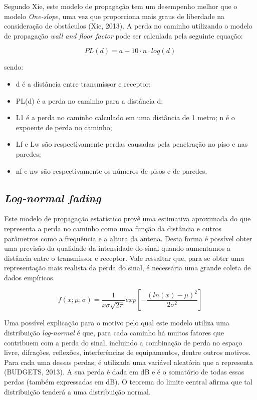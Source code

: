 \documentclass[
	12pt,				%
	openright,			%
	twoside,			%
	a4paper,			%
	english,			%
	french,				%
	spanish,			%
	brazil				%
	]{abntex2}
\begin{document}
Segundo Xie, este modelo de propagação tem um desempenho melhor que o modelo \textit{One-slope}, uma vez que proporciona mais graus de liberdade na consideração de obstáculos (Xie, 2013). A perda no caminho utilizando o modelo de propagação \textit{wall and floor factor} pode ser calculada pela seguinte equação:


\begin{equation}
PL(d) = a + 10 \cdot n \cdot log(d)
\end{equation}

sendo:

\begin{itemize}
	\item d é a distância entre transmissor e receptor;
	\item PL(d) é a perda no caminho para a distância d;
	\item L1 é a perda no caminho calculado em uma distância de 1 metro;
	n é o expoente de perda no caminho;
	\item Lf e Lw são respectivamente perdas causadas pela penetração no piso e nas paredes;
	\item nf e nw são respectivamente os números de pisos e de paredes.
\end{itemize}


\subsection[Log-normal fading]{\textit{Log-normal fading}}

Este modelo de propagação estatístico provê uma estimativa aproximada do que representa a perda no caminho como uma função da distância e outros parâmetros como a frequência e a altura da antena. Desta forma é possível obter uma previsão da qualidade da intensidade do sinal quando aumentamos a distância entre o transmissor e receptor. Vale ressaltar que, para se obter uma representação mais realista da perda do sinal, é necessária uma grande coleta de dados empíricos.


\begin{equation}
f(x; \mu; \sigma) = \frac{1}{x \sigma \sqrt{2 \pi}} exp[-\frac{(ln(x) - \mu)^{2}}{2 \sigma^{2}}]
\end{equation}

Uma possível explicação para o motivo pelo qual este modelo utiliza uma distribuição \textit{log-normal} é que, para cada caminho há muitos fatores que contribuem com a perda do sinal, incluindo a combinação de perda no espaço livre, difrações, reflexões, interferências de equipamentos, dentre outros motivos. Para cada uma dessas perdas, é utilizada uma variável aleatória que a representa (BUDGETS, 2013). A sua perda é dada em dB e é o somatório de todas essas perdas (também expressadas em dB). O teorema do limite central afirma que tal distribuição tenderá a uma distribuição normal.
\end{document}
